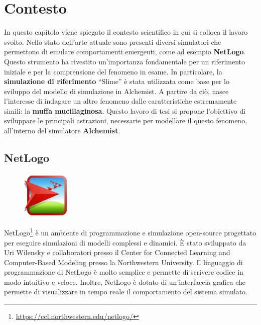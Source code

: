 \chapter{Contesto}
In questo capitolo viene spiegato il contesto scientifico in cui si colloca il lavoro svolto.
Nello stato dell'arte attuale sono presenti diversi simulatori che permettono di emulare comportamenti emergenti, come ad esempio \textbf{NetLogo}.
Questo strumento ha rivestito un'importanza fondamentale per un riferimento iniziale e per la comprensione del fenomeno in esame.
In particolare, la \textbf{simulazione di riferimento} ``Slime'' è stata utilizzata come base per lo sviluppo del modello di simulazione in Alchemist.
A partire da ciò, nasce l'interesse di indagare un altro fenomeno dalle caratteristiche estremamente simili: la \textbf{muffa mucillaginosa}.
Questo lavoro di tesi si propone l'obiettivo di sviluppare le principali astrazioni, necessarie per modellare il questo fenomeno,
all'interno del simulatore \textbf{Alchemist}.

\section{NetLogo}

\begin{figure}
    \centering
    \includegraphics[width=0.2\textwidth]{figures/net.png}
\end{figure}

NetLogo\footnote{\url{https://ccl.northwestern.edu/netlogo/}}\space\cite{wilensky1997netlogo} è un ambiente di programmazione e simulazione open-source
progettato per eseguire simulazioni di modelli complessi e dinamici. È stato sviluppato da Uri Wilensky
e collaboratori presso il Center for Connected Learning and Computer-Based Modeling presso la Northwestern University.
Il linguaggio di programmazione di NetLogo è molto semplice e permette di scrivere codice in modo
intuitivo e veloce. Inoltre, NetLogo è dotato di un'interfaccia grafica che permette di visualizzare
in tempo reale il comportamento del sistema simulato. 

